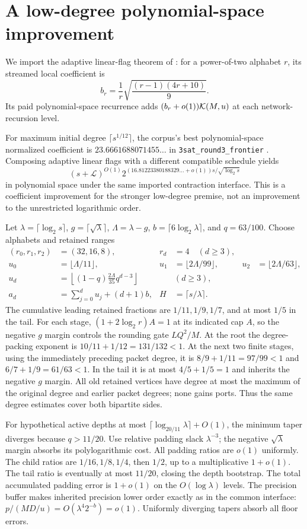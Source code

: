 \section{A low-degree polynomial-space improvement}\label{sec:lowdegree}

We import the adaptive linear-flag theorem of \cite{flags}: for a power-of-two alphabet $r$, its streamed local coefficient is
\[
 b_r=\frac1r\sqrt{\frac{(r-1)(4r+10)}9}.
\]
Its paid polynomial-space recurrence adds $(b_r+o(1))\mathcal K(M,u)$ at each network-recursion level.

For maximum initial degree $\lceil s^{1/12}\rceil$, the corpus's best
polynomial-space normalized coefficient is $23.6661688071455\ldots$ in
\texttt{3sat\_round3\_frontier} \cite{lowbaseline}. Composing adaptive linear flags with a
different compatible schedule yields
\[
 (s+\mathcal L)^{O(1)}
 2^{(16.81223380188329\ldots+o(1))s/\sqrt{\log_2s}}
\]
in polynomial space under the same imported contraction interface.
This is a coefficient improvement for the stronger low-degree premise,
not an improvement to the unrestricted logarithmic order.

Let $\lambda=\lceil\log_2s\rceil$, $g=\lceil\sqrt\lambda\rceil$,
$\Lambda=\lambda-g$, $b=\lceil6\log_2\lambda\rceil$, and $q=63/100$.
Choose alphabets and retained ranges
\begin{align*}
 (r_0,r_1,r_2)&=(32,16,8),&r_d&=4\quad(d\ge3),\\
 u_0&=\lfloor\Lambda/11\rfloor,&
 u_1&=\lfloor2\Lambda/99\rfloor,&
 u_2&=\lfloor2\Lambda/63\rfloor,\\
 u_d&=\left\lfloor(1-q)\frac{2\Lambda}{35}q^{d-3}\right\rfloor
 &&(d\ge3),\\
 a_d&=\sum_{j=0}^du_j+(d+1)b,& H&=\lceil s/\lambda\rceil.
\end{align*}
The cumulative leading retained fractions are $1/11,1/9,1/7$, and at
most $1/5$ in the tail. For each stage, $(1+2\log_2r)A=1$ at its indicated
cap $A$, so the negative $g$ margin controls the rounding gate $LQ^2/M$.
At the root the degree-packing exponent is
$10/11+1/12=131/132<1$. At the next two finite stages, using the immediately
preceding packet degree, it is $8/9+1/11=97/99<1$ and
$6/7+1/9=61/63<1$. In the tail it is at most $4/5+1/5=1$ and inherits
the negative $g$ margin. All old retained vertices have degree at most
the maximum of the original degree and earlier packet degrees; none gains
ports. Thus the same degree estimates cover both bipartite sides.

For hypothetical active depths at most
$\lceil\log_{20/11}\lambda\rceil+O(1)$, the minimum taper diverges because
$q>11/20$. Use relative padding slack $\lambda^{-3}$; the negative
$\sqrt\lambda$ margin absorbs its polylogarithmic cost.
All padding ratios are $o(1)$ uniformly. The child ratios are
$1/16,1/8,1/4$, then $1/2$, up to a multiplicative $1+o(1)$.
The tail ratio is eventually at most $11/20$, closing the depth bootstrap.
The total accumulated padding error is $1+o(1)$ on the $O(\log\lambda)$
levels. The precision buffer makes inherited precision lower order exactly
as in the common interface: $p/(MD/u)=O(\lambda^4 2^{-b})=o(1)$.
Uniformly diverging tapers absorb all floor errors.

